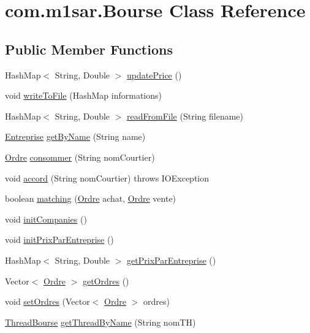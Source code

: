 \hypertarget{classcom_1_1m1sar_1_1_bourse}{}\section{com.\+m1sar.\+Bourse Class Reference}
\label{classcom_1_1m1sar_1_1_bourse}
\subsection*{Public Member Functions}
\begin{DoxyCompactItemize}
\item 
Hash\+Map$<$ String, Double $>$ \hyperlink{classcom_1_1m1sar_1_1_bourse_a36588334a5398fdd07745a39ac809fa0}{update\+Price} ()
\item 
void \hyperlink{classcom_1_1m1sar_1_1_bourse_a04a69e51bbab147243a5b9f37fcc561a}{write\+To\+File} (Hash\+Map informations)
\item 
Hash\+Map$<$ String, Double $>$ \hyperlink{classcom_1_1m1sar_1_1_bourse_a807d02571a2cfdfccb83b74549a3e208}{read\+From\+File} (String filename)
\item 
\hyperlink{classcom_1_1m1sar_1_1_entreprise}{Entreprise} \hyperlink{classcom_1_1m1sar_1_1_bourse_a5b396735aca0672d7f37a2eb098f4edf}{get\+By\+Name} (String name)
\item 
\hyperlink{classcom_1_1m1sar_1_1_ordre}{Ordre} \hyperlink{classcom_1_1m1sar_1_1_bourse_aeb40be5d0f691a90eb1f6629f42e56de}{consommer} (String nom\+Courtier)
\item 
void \hyperlink{classcom_1_1m1sar_1_1_bourse_aa084f404d85f7292a1238ebc38ceac09}{accord} (String nom\+Courtier)  throws I\+O\+Exception 
\item 
boolean \hyperlink{classcom_1_1m1sar_1_1_bourse_a0bfccebb42e75ab2465b86ceb2ec9f68}{matching} (\hyperlink{classcom_1_1m1sar_1_1_ordre}{Ordre} achat, \hyperlink{classcom_1_1m1sar_1_1_ordre}{Ordre} vente)
\item 
void \hyperlink{classcom_1_1m1sar_1_1_bourse_a735c9da562fa5e84f2cc50cfed378bd9}{init\+Companies} ()
\item 
void \hyperlink{classcom_1_1m1sar_1_1_bourse_ae4e655b8d10208ff6b9e73eb62767558}{init\+Prix\+Par\+Entreprise} ()
\item 
Hash\+Map$<$ String, Double $>$ \hyperlink{classcom_1_1m1sar_1_1_bourse_ae68d9ea867f6e9043afe0b5868dda5fe}{get\+Prix\+Par\+Entreprise} ()
\item 
Vector$<$ \hyperlink{classcom_1_1m1sar_1_1_ordre}{Ordre} $>$ \hyperlink{classcom_1_1m1sar_1_1_bourse_acdeb99f593d0fdc0743934cb7e692156}{get\+Ordres} ()
\item 
void \hyperlink{classcom_1_1m1sar_1_1_bourse_a33e6699fa91c63f54221f1ebf3de723b}{set\+Ordres} (Vector$<$ \hyperlink{classcom_1_1m1sar_1_1_ordre}{Ordre} $>$ ordres)
\item 
\hyperlink{classcom_1_1m1sar_1_1_thread_bourse}{Thread\+Bourse} \hyperlink{classcom_1_1m1sar_1_1_bourse_a2c4daf19799b68d297a686df4aebb0c4}{get\+Thread\+By\+Name} (String nom\+TH)
\end{DoxyCompactItemize}

